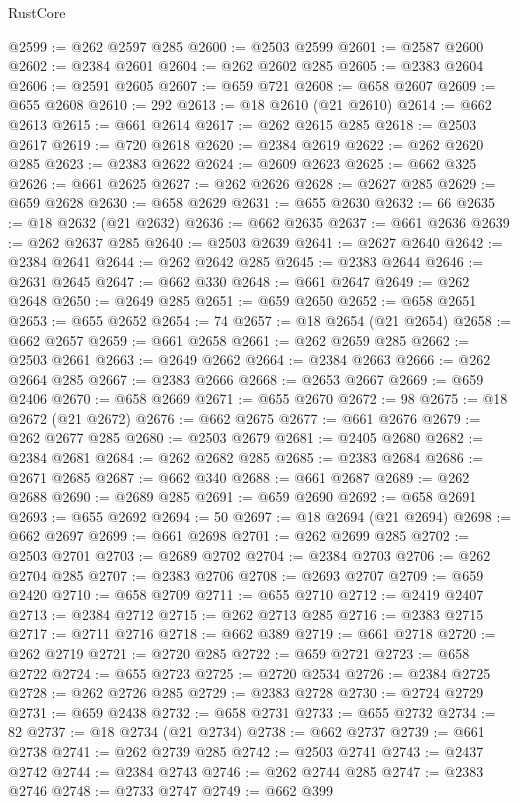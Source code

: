 \begin{lexlean}{RustCore}
\begin{coremodule}
@2599 := @262 @2597 @285
@2600 := @2503 @2599
@2601 := @2587 @2600
@2602 := @2384 @2601
@2604 := @262 @2602 @285
@2605 := @2383 @2604
@2606 := @2591 @2605
@2607 := @659 @721
@2608 := @658 @2607
@2609 := @655 @2608
@2610 := 292
@2613 := @18 @2610 (@21 @2610)
@2614 := @662 @2613
@2615 := @661 @2614
@2617 := @262 @2615 @285
@2618 := @2503 @2617
@2619 := @720 @2618
@2620 := @2384 @2619
@2622 := @262 @2620 @285
@2623 := @2383 @2622
@2624 := @2609 @2623
@2625 := @662 @325
@2626 := @661 @2625
@2627 := @262 @2626
@2628 := @2627 @285
@2629 := @659 @2628
@2630 := @658 @2629
@2631 := @655 @2630
@2632 := 66
@2635 := @18 @2632 (@21 @2632)
@2636 := @662 @2635
@2637 := @661 @2636
@2639 := @262 @2637 @285
@2640 := @2503 @2639
@2641 := @2627 @2640
@2642 := @2384 @2641
@2644 := @262 @2642 @285
@2645 := @2383 @2644
@2646 := @2631 @2645
@2647 := @662 @330
@2648 := @661 @2647
@2649 := @262 @2648
@2650 := @2649 @285
@2651 := @659 @2650
@2652 := @658 @2651
@2653 := @655 @2652
@2654 := 74
@2657 := @18 @2654 (@21 @2654)
@2658 := @662 @2657
@2659 := @661 @2658
@2661 := @262 @2659 @285
@2662 := @2503 @2661
@2663 := @2649 @2662
@2664 := @2384 @2663
@2666 := @262 @2664 @285
@2667 := @2383 @2666
@2668 := @2653 @2667
@2669 := @659 @2406
@2670 := @658 @2669
@2671 := @655 @2670
@2672 := 98
@2675 := @18 @2672 (@21 @2672)
@2676 := @662 @2675
@2677 := @661 @2676
@2679 := @262 @2677 @285
@2680 := @2503 @2679
@2681 := @2405 @2680
@2682 := @2384 @2681
@2684 := @262 @2682 @285
@2685 := @2383 @2684
@2686 := @2671 @2685
@2687 := @662 @340
@2688 := @661 @2687
@2689 := @262 @2688
@2690 := @2689 @285
@2691 := @659 @2690
@2692 := @658 @2691
@2693 := @655 @2692
@2694 := 50
@2697 := @18 @2694 (@21 @2694)
@2698 := @662 @2697
@2699 := @661 @2698
@2701 := @262 @2699 @285
@2702 := @2503 @2701
@2703 := @2689 @2702
@2704 := @2384 @2703
@2706 := @262 @2704 @285
@2707 := @2383 @2706
@2708 := @2693 @2707
@2709 := @659 @2420
@2710 := @658 @2709
@2711 := @655 @2710
@2712 := @2419 @2407
@2713 := @2384 @2712
@2715 := @262 @2713 @285
@2716 := @2383 @2715
@2717 := @2711 @2716
@2718 := @662 @389
@2719 := @661 @2718
@2720 := @262 @2719
@2721 := @2720 @285
@2722 := @659 @2721
@2723 := @658 @2722
@2724 := @655 @2723
@2725 := @2720 @2534
@2726 := @2384 @2725
@2728 := @262 @2726 @285
@2729 := @2383 @2728
@2730 := @2724 @2729
@2731 := @659 @2438
@2732 := @658 @2731
@2733 := @655 @2732
@2734 := 82
@2737 := @18 @2734 (@21 @2734)
@2738 := @662 @2737
@2739 := @661 @2738
@2741 := @262 @2739 @285
@2742 := @2503 @2741
@2743 := @2437 @2742
@2744 := @2384 @2743
@2746 := @262 @2744 @285
@2747 := @2383 @2746
@2748 := @2733 @2747
@2749 := @662 @399

\end{coremodule}
\end{lexlean}
